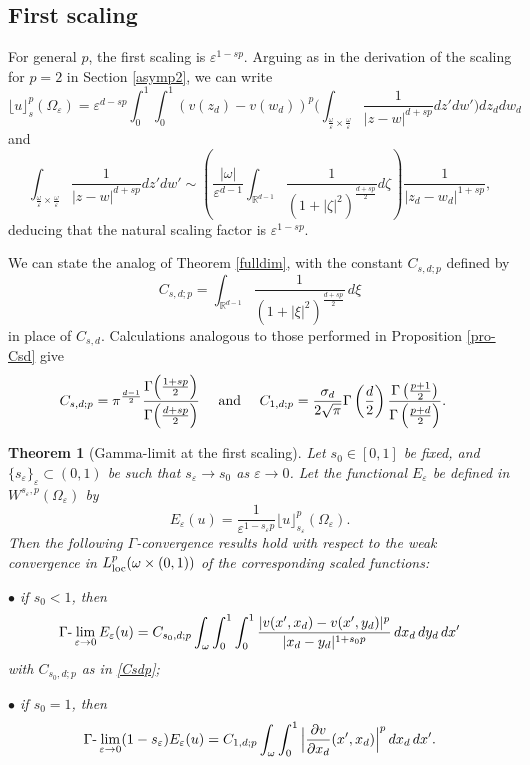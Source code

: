 \documentclass[11pt]{article}
\newtheorem{theorem}[definition]{Theorem}
\def\e{\varepsilon}
\begin{document}
\subsection{First scaling}

For general $p$, the first scaling is $\e^{1-sp}$. Arguing as in the derivation of the scaling for $p=2$ in Section \ref{asymp2}, we can write
\begin{equation*}
\lfloor u\rfloor_s^p(\Omega_\e)=\e^{d-sp}
\int_0^1\int_0^1(v(z_d)-v(w_d))^p\Big(\int_{\frac\omega\e\times\frac\omega\e}\frac{1}{|z-w|^{d+sp}}dz' dw'\Big)dz_d dw_d
\end{equation*}
and
\begin{equation*}
\int_{\frac\omega\e\times\frac\omega\e}\frac{1}{|z-w|^{d+sp}}dz' dw'
\sim \left(\frac{|\omega|}{\e^{d-1}}\int_{\mathbb R^{d-1}}\frac1{(1+ |\zeta|^2)^{\frac{d+sp}{2}}}d\zeta\right) \frac1{|z_d-w_d|^{1+sp}},
\end{equation*}
deducing that the natural scaling factor is $\e^{1-sp}$.


We can state the analog of Theorem \ref{fulldim}, with the constant $C_{s,d;p}$ defined by
\begin{equation}\label{Csdp}
C_{s,d;p}=\int_{\mathbb R^{d-1}}
\frac{1}{(1+|\xi|^2)^{\frac{d+sp}{2}}}\, d\xi
\end{equation} 
in place of $C_{s,d}$. Calculations analogous to those performed in Proposition \ref{pro-Csd} give
\begin{align*}
C_{s,d;p}&=\pi^{\frac{d-1}{2}}\frac{\Gamma\Big(\frac{1+sp}{2}\Big)}{\Gamma\Big(\frac{d+sp}{2}\Big)}\quad 
\hbox{ and }\quad  C_{1,d;p} =\frac{\sigma_d}{2\sqrt{\pi}}\Gamma\left(\frac{d}{2}\right)\frac{\Gamma\left(\frac{p+1}{2}\right)}{\Gamma\left(\frac{p+d}{2}\right)}.
\end{align*}

\begin{theorem}[Gamma-limit at the first scaling]\label{fulldim-p} 
Let $s_0\in[0,1]$ be fixed, and $\{s_\e\}_\e\subset (0,1)$ be such that $s_\e\to s_0$ as $\e\to 0$. 
Let the functional $E_\e$ be defined in $W^{s_\e,p}(\Omega_\e)$ by 
$$E_\e(u)=\frac{1}{\e^{1-s_\e p}}\lfloor u\rfloor_{s_\e}^{p}(\Omega_\e).$$ 
Then the following 
$\Gamma$-convergence results hold with respect to the weak convergence in $L^p_{
\rm loc}(\omega\times (0,1))$ of the corresponding scaled functions:

\smallskip
\indent $\bullet$ if $s_0<1$, then 
$$\Gamma\hbox{\rm -}\lim_{\e\to 0}{E_\e}({u})=C_{s_0,d;p}\int_{\omega}\int_0^1\int_0^1\frac{|v(x^\prime, x_d)-v(x^\prime, y_d)|^p}{|x_d-y_d|^{1+s_0 p}}\, dx_d\, dy_d\, dx^\prime$$
\hspace{8mm} 
with $C_{s_0,d;p}$ as in \eqref{Csdp};

\smallskip\indent $\bullet$ if $s_0=1$, then 
\begin{equation*}\Gamma\hbox{\rm -}\lim_{\e\to 0}(1-s_\e){E_\e}(u)
= 
C_{1,d;p}\int_{\omega}\int_0^1 \Big|\frac{\partial v}{\partial x_d}(x^\prime,x_d)\Big|^p\,dx_d\, dx^\prime.
\end{equation*}
\end{theorem} 
\end{document}
